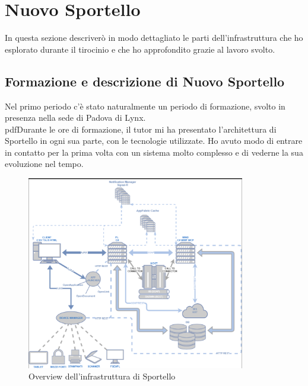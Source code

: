 \section{Nuovo Sportello}

In questa sezione descriverò in modo dettagliato le parti dell'infrastruttura che ho esplorato durante il tirocinio e che ho approfondito grazie al lavoro svolto.

\subsection{Formazione e descrizione di Nuovo Sportello}

Nel primo periodo c'è stato naturalmente un periodo di formazione, svolto in presenza nella sede di Padova di Lynx. \\ 
pdfDurante le ore di formazione, il tutor \NST mi ha presentato l'architettura di Sportello in ogni sua parte, con le tecnologie utilizzate. Ho avuto modo di entrare in contatto per la prima volta con un sistema molto complesso e di vederne la sua evoluzione nel tempo. \\

\begin{figure}[!ht]
    \centering
	\includegraphics[width=0.85\textwidth]{./res/img/infrastruttura sportello.png}
    \caption{Overview dell'infrastruttura di Sportello}
\end{figure}

